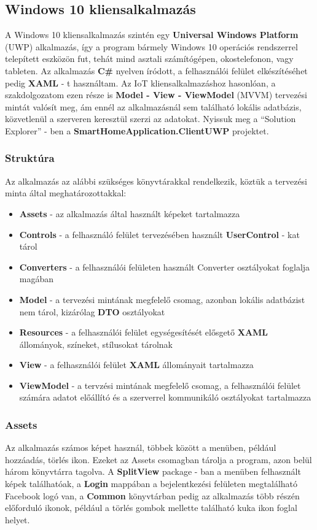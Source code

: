 \documentclass[a4paper,12pt]{report}
\begin{document}
 \subsection{Windows 10 kliensalkalmazás}
    A Windows 10 kliensalkalmazás szintén egy \textbf{Universal Windows Platform} (UWP) alkalmazás, így a program bármely Windows 10
    operációs rendszerrel telepített eszközön fut, tehát mind asztali számítógépen, okostelefonon, vagy tableten. Az alkalmazás \textbf{C\#} nyelven
    íródott, a felhasználói felület elkészítéséhet pedig \textbf{XAML} - t használtam. Az IoT kliensalkalmazáshoz hasonlóan, a szakdolgozatom
    ezen része is \textbf{Model - View - ViewModel} (MVVM) tervezési mintát valósít meg, ám ennél az alkalmazásnál sem található lokális
    adatbázis, közvetlenül a szerveren keresztül szerzi az adatokat. Nyissuk meg a ``Solution Explorer'' - ben a \textbf{SmartHomeApplication.ClientUWP}
    projektet.

 \subsubsection{Struktúra}
    Az alkalmazás az alábbi szükséges könyvtárakkal rendelkezik, köztük a tervezési minta által meghatározottakkal:

\begin{itemize}
    \item \textbf{Assets} - az alkalmazás által használt képeket tartalmazza
    \item \textbf{Controls} - a felhasználó felület tervezésében használt \textbf{UserControl} - kat tárol
    \item \textbf{Converters} - a felhasználói felületen használt Converter osztályokat foglalja magában
    \item \textbf{Model} - a tervezési mintának megfelelő csomag, azonban lokális adatbázist nem tárol, kizárólag \textbf{DTO} osztályokat
    \item \textbf{Resources} - a felhasználói felület egységesítését elősgető \textbf{XAML} állományok, színeket, stílusokat tárolnak
    \item \textbf{View} - a felhasználói felület \textbf{XAML} állományait tartalmazza
    \item \textbf{ViewModel} - a tervzési mintának megfelelő csomag, a felhasználói felület számára adatot előállító és a szerverrel
    kommunikáló osztályokat tartalmazza
\end{itemize}

\subsubsection{Assets}
    Az alkalmazás számos képet használ, többek között a menüben, például hozzáadás, törlés ikon. Ezeket az Assets csomagban tárolja a program,
    azon belül három könyvtárra tagolva. A \textbf{SplitView} package - ban a menüben felhasznált képek találhatóak, a \textbf{Login} mappában
    a bejelentkezési felületen megtalálható Facebook logó van, a \textbf{Common} könyvtárban pedig az alkalmazás több részén előforduló ikonok,
    például a törlés gombok mellette található kuka ikon foglal helyet.
\end{document}
